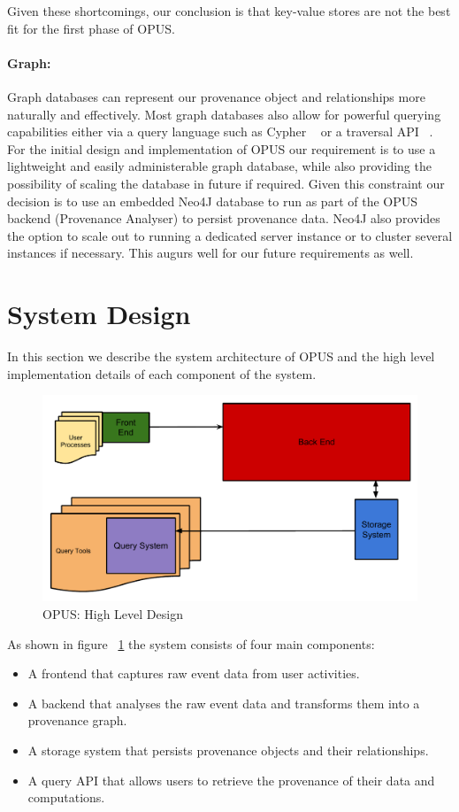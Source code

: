 \documentclass[withindex,glossary]{cam-thesis}
\begin{document}
Given these shortcomings, our conclusion is that key-value stores are not the best fit for the first phase of OPUS.

\paragraph{Graph:} 
Graph databases can represent our provenance object and relationships more naturally and effectively.
Most graph databases also allow for powerful querying capabilities either via a query language such as Cypher ~\cite{Cypher}  or a traversal API ~\cite{Gremlin}.
For the initial design and implementation of OPUS our requirement is to use a lightweight and easily administerable graph database, while also providing the possibility of scaling the database in future if required.
Given this constraint our decision is to use an embedded Neo4J database to run as part of the OPUS backend (Provenance Analyser) to persist provenance data.
Neo4J also provides the option to scale out to running a dedicated server instance or to cluster several instances if necessary.
This augurs well for our future requirements as well.

\section{System Design}
In this section we describe the system architecture of OPUS and the high level implementation details of each component of the system.

\begin{figure}[t!]
  \centering
    \includegraphics[width=1.0\columnwidth]{BroadProvDesign}
  \caption{OPUS: High Level Design}
  \label{fig:opushld}
\end{figure}

As shown in figure ~\ref{fig:opushld} the system consists of four main components:
\begin{itemize}
\item A frontend that captures raw event data from user activities.
\item A backend that analyses the raw event data and transforms them into a provenance graph.
\item A storage system that persists provenance objects and their relationships.
\item A query API that allows users to retrieve the provenance of their data and computations.
\end{itemize} 
\end{document}
